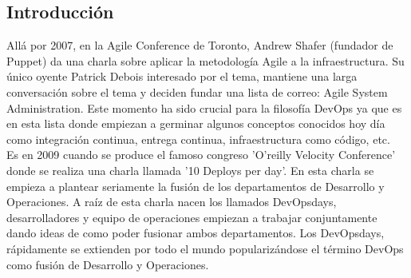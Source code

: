 	\subsection{Introducción}
	\begin{text}
		Allá por 2007, en la Agile Conference de Toronto, Andrew Shafer (fundador de Puppet) da una charla sobre aplicar la metodología Agile a la infraestructura. Su único oyente Patrick Debois interesado por el tema, mantiene una larga conversación sobre el tema y deciden fundar una lista de correo: Agile System Administration. Este momento ha sido crucial para la filosofía DevOps ya que es en esta lista donde empiezan a germinar algunos conceptos conocidos hoy día como integración continua, entrega continua, infraestructura como código, etc.\\
		Es en 2009 cuando se produce el famoso congreso  'O'reilly Velocity Conference' donde se realiza una charla llamada '10 Deploys per day'. En esta charla se empieza a plantear seriamente la fusión de los departamentos de Desarrollo y Operaciones. A raíz de esta charla nacen los llamados DevOpsdays, desarrolladores y equipo de operaciones empiezan a trabajar conjuntamente dando ideas de como poder fusionar ambos departamentos. Los DevOpsdays, rápidamente se extienden por todo el mundo popularizándose el término DevOps como fusión de Desarrollo y Operaciones. \\


\end{text}
